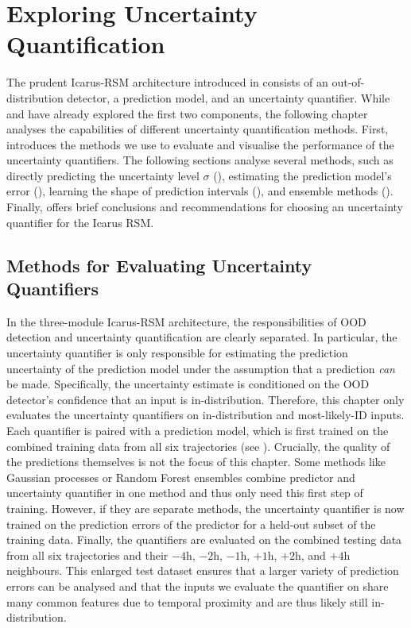 \chapter{Exploring Uncertainty Quantification} \label{txt:uncertainty-chapter}

The prudent Icarus-RSM architecture introduced in  consists of an out-of-distribution detector, a prediction model, and an uncertainty quantifier. While  and  have already explored the first two components, the following chapter analyses the capabilities of different uncertainty quantification methods. First,  introduces the methods we use to evaluate and visualise the performance of the uncertainty quantifiers. The following sections analyse several methods, such as directly predicting the uncertainty level $\sigma$ (), estimating the prediction model's error (), learning the shape of prediction intervals (), and ensemble methods (). Finally,  offers brief conclusions and recommendations for choosing an uncertainty quantifier for the Icarus RSM.

\section{Methods for Evaluating Uncertainty Quantifiers} \label{txt:uncertainty-methods}

In the three-module Icarus-RSM architecture, the responsibilities of OOD detection and uncertainty quantification are clearly separated. In particular, the uncertainty quantifier is only responsible for estimating the prediction uncertainty of the prediction model under the assumption that a prediction \textit{can} be made. Specifically, the uncertainty estimate is conditioned on the OOD detector's confidence that an input is in-distribution. Therefore, this chapter only evaluates the uncertainty quantifiers on in-distribution and most-likely-ID inputs. Each quantifier is paired with a prediction model, which is first trained on the combined training data from all six trajectories (see ). Crucially, the quality of the predictions themselves is not the focus of this chapter. Some methods like Gaussian processes or Random Forest ensembles combine predictor and uncertainty quantifier in one method and thus only need this first step of training. However, if they are separate methods, the uncertainty quantifier is now trained on the prediction errors of the predictor for a held-out subset of the training data. Finally, the quantifiers are evaluated on the combined testing data from all six trajectories and their $-4\text{h}$, $-2\text{h}$, $-1\text{h}$, $+1\text{h}$, $+2\text{h}$, and $+4\text{h}$ neighbours. This enlarged test dataset ensures that a larger variety of prediction errors can be analysed and that the inputs we evaluate the quantifier on share many common features due to temporal proximity and are thus likely still in-distribution.

